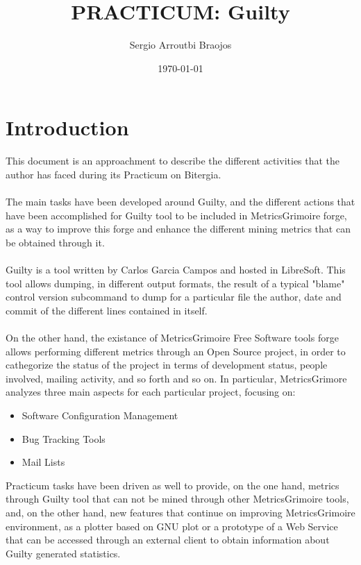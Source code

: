 \documentclass[11pt]{article}
\title{\textbf{PRACTICUM: Guilty}}
\author{Sergio Arroutbi Braojos}
\date{\today}
\begin{document}
\maketitle

\section{Introduction}
This document is an approachment to describe the different activities that the author has faced during its Practicum on Bitergia.\\
\\
The main tasks have been developed around Guilty, and the different actions that have been accomplished for Guilty tool to be included in MetricsGrimoire forge, as a way to improve this forge and enhance the different mining metrics that can be obtained through it.\\
\\
Guilty is a tool written by Carlos Garcia Campos and hosted in LibreSoft. This tool allows dumping, in different output formats, the result of a typical "blame" control version subcommand to dump for a particular file the author, date and commit of the different lines contained in itself.\\
\\
On the other hand, the existance of MetricsGrimoire Free Software tools forge allows performing different metrics through an Open Source project, in order to cathegorize the status of the project in terms of development status, people involved, mailing activity, and so forth and so on. In particular, MetricsGrimore analyzes three main aspects for each particular project, focusing on:
\begin{itemize}
\item{Software Configuration Management}
\item{Bug Tracking Tools}
\item{Mail Lists}
\end{itemize}
Practicum tasks have been driven as well to provide, on the one hand, metrics through Guilty tool that can not be mined through other MetricsGrimoire tools, and, on the other hand, new features that continue on improving MetricsGrimoire environment, as a plotter based on GNU plot or a prototype of a Web Service that can be accessed through an external client to obtain information about Guilty generated statistics.
\end{document}

